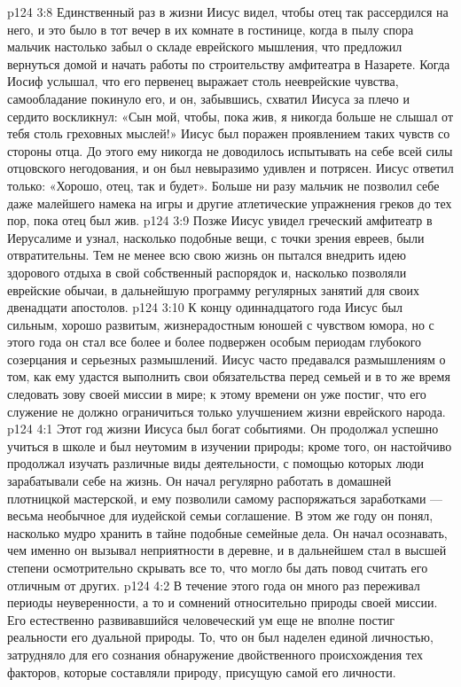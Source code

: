 \vs p124 3:8 Единственный раз в жизни Иисус видел, чтобы отец так рассердился на него, и это было в тот вечер в их комнате в гостинице, когда в пылу спора мальчик настолько забыл о складе еврейского мышления, что предложил вернуться домой и начать работы по строительству амфитеатра в Назарете. Когда Иосиф услышал, что его первенец выражает столь нееврейские чувства, самообладание покинуло его, и он, забывшись, схватил Иисуса за плечо и сердито воскликнул: «Сын мой, чтобы, пока жив, я никогда больше не слышал от тебя столь греховных мыслей!» Иисус был поражен проявлением таких чувств со стороны отца. До этого ему никогда не доводилось испытывать на себе всей силы отцовского негодования, и он был невыразимо удивлен и потрясен. Иисус ответил только: «Хорошо, отец, так и будет». Больше ни разу мальчик не позволил себе даже малейшего намека на игры и другие атлетические упражнения греков до тех пор, пока отец был жив.
\vs p124 3:9 Позже Иисус увидел греческий амфитеатр в Иерусалиме и узнал, насколько подобные вещи, с точки зрения евреев, были отвратительны. Тем не менее всю свою жизнь он пытался внедрить идею здорового отдыха в свой собственный распорядок и, насколько позволяли еврейские обычаи, в дальнейшую программу регулярных занятий для своих двенадцати апостолов.
\vs p124 3:10 К концу одиннадцатого года Иисус был сильным, хорошо развитым, жизнерадостным юношей с чувством юмора, но с этого года он стал все более и более подвержен особым периодам глубокого созерцания и серьезных размышлений. Иисус часто предавался размышлениям о том, как ему удастся выполнить свои обязательства перед семьей и в то же время следовать зову своей миссии в мире; к этому времени он уже постиг, что его служение не должно ограничиться только улучшением жизни еврейского народа.
\vs p124 4:1 Этот год жизни Иисуса был богат событиями. Он продолжал успешно учиться в школе и был неутомим в изучении природы; кроме того, он настойчиво продолжал изучать различные виды деятельности, с помощью которых люди зарабатывали себе на жизнь. Он начал регулярно работать в домашней плотницкой мастерской, и ему позволили самому распоряжаться заработками --- весьма необычное для иудейской семьи соглашение. В этом же году он понял, насколько мудро хранить в тайне подобные семейные дела. Он начал осознавать, чем именно он вызывал неприятности в деревне, и в дальнейшем стал в высшей степени осмотрительно скрывать все то, что могло бы дать повод считать его отличным от других.
\vs p124 4:2 В течение этого года он много раз переживал периоды неуверенности, а то и сомнений относительно природы своей миссии. Его естественно развивавшийся человеческий ум еще не вполне постиг реальности его дуальной природы. То, что он был наделен единой личностью, затрудняло для его сознания обнаружение двойственного происхождения тех факторов, которые составляли природу, присущую самой его личности.
